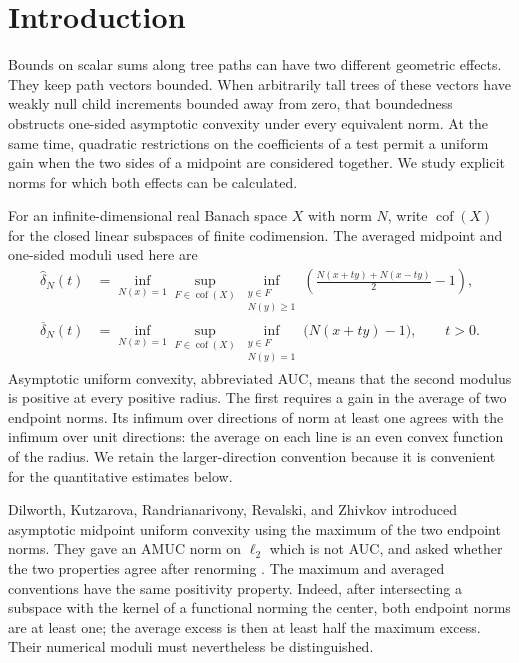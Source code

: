 \section{Introduction}\label{sec:introduction}

Bounds on scalar sums along tree paths can have two different geometric
effects. They keep path vectors bounded. When arbitrarily tall trees of
these vectors have weakly null child increments bounded away from zero,
that boundedness obstructs one-sided asymptotic convexity under every
equivalent norm. At the same time, quadratic restrictions on the
coefficients of a test permit a uniform gain when the two sides of a
midpoint are considered together. We study explicit norms for which both
effects can be calculated.

For an infinite-dimensional real Banach space $X$ with norm $N$, write
$\operatorname{cof}(X)$ for the closed linear subspaces of finite
codimension. The averaged midpoint and one-sided moduli used here are
\begin{align}
 \widehat\delta_N(t)
 &=\inf_{N(x)=1}\sup_{F\in\operatorname{cof}(X)}
   \inf_{\substack{y\in F\\N(y)\ge1}}
   \left(\frac{N(x+ty)+N(x-ty)}2-1\right),
   \label{eq:averaged-modulus}\\
 \overline\delta_N(t)
 &=\inf_{N(x)=1}\sup_{F\in\operatorname{cof}(X)}
   \inf_{\substack{y\in F\\N(y)=1}}\bigl(N(x+ty)-1\bigr),
   \qquad t>0.\label{eq:auc-modulus}
\end{align}
Asymptotic uniform convexity, abbreviated AUC, means that the second
modulus is positive at every positive radius. The first requires a
gain in the average of two endpoint norms. Its infimum over directions
of norm at least one agrees with the infimum over unit directions:
the average on each line is an even convex function of the radius.
We retain the larger-direction convention because it is convenient
for the quantitative estimates below.

Dilworth, Kutzarova, Randrianarivony, Revalski, and Zhivkov introduced
asymptotic midpoint uniform convexity using the maximum of the two
endpoint norms. They gave an AMUC norm on $\ell_2$ which is not AUC,
and asked whether the two properties agree after renorming
\cite[Definition~2.2, Theorem~2.4, and Section~5]{DKRRZ2016}.
The maximum and averaged conventions have the same positivity
property. Indeed, after intersecting a subspace with the kernel of
a functional norming the center, both endpoint norms are at least
one; the average excess is then at least half the maximum excess.
Their numerical moduli must nevertheless be distinguished.

